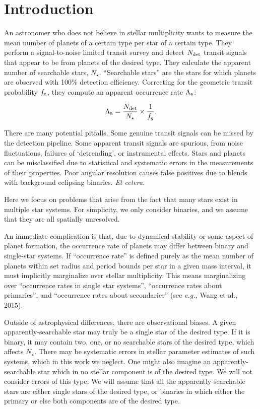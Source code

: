\section{Introduction}

An astronomer who does not believe in stellar multiplicity wants to measure the
mean number of planets of a certain type per star of a certain type.
They perform a signal-to-noise limited transit survey and detect $N_{\rm det}$ 
transit signals that appear to be from planets of the desired type.  They 
calculate the apparent number of searchable stars, $N_\star$.  ``Searchable 
stars'' are the stars for which 
planets are observed with 100\% detection efficiency. 
Correcting for the geometric 
transit probability $f_{\rm g}$, they compute an apparent occurrence rate 
$\Lambda_{\rm a}$:

\begin{equation}
\Lambda_{\rm a} = \frac{N_{\rm det}}{N_\star} \times \frac{1}{f_g}.
\end{equation}

There are many potential pitfalls.  Some genuine transit signals can be missed
by the detection pipeline.  Some apparent transit signals are spurious, from
noise fluctuations, failures of `detrending', or instrumental effects.  Stars
and planets can be misclassified due to statistical and systematic errors in
the measurements of their properties.  Poor angular resolution causes false
positives due to blends with background eclipsing binaries. {\it Et cetera}.

Here we focus on problems that arise from the fact that many stars exist in 
multiple star systems.
For simplicity, we only consider binaries, and we assume that they are all 
spatially unresolved.

An immediate complication is that, due to dynamical stability or some 
aspect of planet formation, the occurrence rate of planets may differ 
between binary and single-star systems.
If ``occurrence rate'' is defined purely as the mean number of planets within 
set radius and period bounds per star in a given mass interval, it must 
implicitly marginalize over stellar multiplicity.
This means marginalizing over ``occurrence rates in single star systems'', 
``occurrence rates about primaries'', and
``occurrence rates about secondaries'' (see {\it e.g.,} Wang et al., 
2015).

Outside of astrophysical differences, there are observational biases.
A given apparently-searchable star may truly be a single star of the desired 
type. If it is binary, it may contain two, one, or no searchable stars of the 
desired type, which affects $N_\star$.
There may be systematic errors in stellar parameter estimates of such 
systems, which in this work we neglect.
One might also imagine an apparently-searchable star which in no stellar 
component is of the desired type. We will not consider errors of this type.  
We will assume that all the apparently-searchable stars are either single 
stars of the desired type, or binaries in which either the primary or else 
both components are of the desired type.

